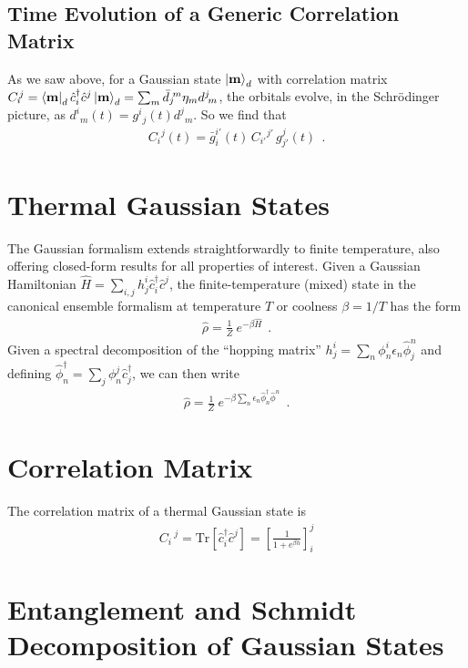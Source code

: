 \documentclass[aps, superscriptaddress, floatfix, onecolumn]{revtex4-2}
\begin{document}
\subsection{Time Evolution of a Generic Correlation Matrix}

As we saw above, for a Gaussian state $\ket{\mathbf{m}}_d$ with correlation matrix $C_i\!^j = \bra{\mathbf{m}}_d \hat{c}^\dagger_i \hat{c}^j \ket{\mathbf{m}}_d = \sum_m \bar{d}_j\!^m \eta_m d^j\!_m$, the orbitals evolve, in the Schr\"odinger picture, as $d^i\!_m(t) = g^i\!_j(t) d^j\!_m$. 
So we find that 
\begin{align}
\boxed{C_i\!^j(t) =  \bar{g}^{i'}_i(t)\, C_{i'}\!^{j'}\, g^j_{j'}(t) } \ \ .
\end{align}


\section{Thermal Gaussian States}

The Gaussian formalism extends straightforwardly to finite temperature, also offering closed-form results for all properties of interest. Given a Gaussian Hamiltonian $\hat{H}= \sum_{i,j} h^i_j \hat{c}^\dagger_i \hat{c}^j$, the finite-temperature (mixed) state in the canonical ensemble formalism at temperature $T$ or coolness $\beta = 1/T$ has the form
\begin{align}
\hat{\rho} = \frac{1}{Z}\ e^{-\beta \hat{H}} \ \ .
\end{align}
Given a spectral decomposition of the ``hopping matrix'' $h^i_j = \sum_n \phi^i_n \epsilon_n \hat{\phi}^n_j$ and defining $\hat{\phi}^\dagger_n = \sum_j \phi^j_n \hat{c}^\dagger_j$, we can then write 
\begin{align}
\hat{\rho} = \frac{1}{Z}\   e^{-\beta \sum_n  \epsilon_n \hat{\phi}^\dagger_n \hat{\phi}^n} \ \ . 
\end{align}

\section{Correlation Matrix}

The correlation matrix of a thermal Gaussian state is 
\begin{align}
C_i\,^j = \text{Tr}[ \hat{c}^\dagger_i \hat{c}^j ] = \left[ \frac{1}{1+e^{\beta h}} \right]_i^j 
\end{align}

\section{Entanglement and Schmidt Decomposition of Gaussian States}
\end{document}

